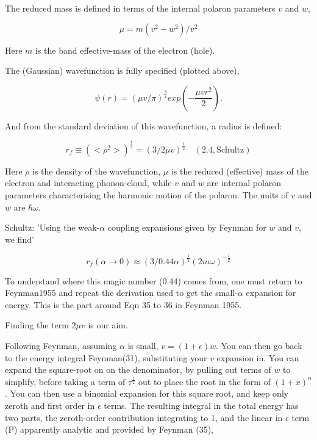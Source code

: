 \documentclass[twocolumn,11pt]{article}
\begin{document}
The reduced mass is defined in terms of the internal polaron parameters $v$ and
$w$,

\begin{equation}
	\mu=m(v^2-w^2)/v^2
\end{equation}

Here $m$ is the band effective-mass of the electron (hole). 

The (Gaussian) wavefunction is fully specified (plotted above),

\begin{equation}
	\psi(r)=(\mu v/\pi)^{\frac{3}{4}} exp(-\frac{\mu v r^2}{2}).
\end{equation}

And from the standard deviation of this wavefunction, a
radius is defined:

\begin{equation}
    r_f \equiv (<\rho^2>)^{\frac{1}{2}} = (3/2\mu v)^{\frac{1}{2}}
    \quad \mathrm{(2.4, Schultz)}
\end{equation}    

Here $\rho$ is the density of the wavefunction, $\mu$ is the reduced
(effective) mass of the electron and interacting phonon-cloud, while
$v$ and \(w\) are internal polaron parameters characterising the
harmonic motion of the polaron. The units of $v$ and \(w\) are
$\hbar\omega$.

Schultz: 'Using the weak-$\alpha$ coupling expansions given by Feynman for $w$
and $v$, we find'

\begin{equation}
    r_f (\alpha\rightarrow 0) \approx (3/0.44\alpha)^{\frac{1}{2}} (2m\omega)^{-\frac{1}{2}}
\end{equation}

To understand where this magic number (0.44) comes from, one must return
to Feynman1955 and repeat the derivation used to get the
small-$\alpha$ expansion for energy. 
This is the part around Eqn 35 to 36 in Feynman 1955.

Finding the term $2\mu v$ is our aim.

Following Feynman, assuming $\alpha$ is small, $v=(1+\epsilon)w$.
You can then go back to the energy integral Feynman(31), substituting
your $v$ expansion in. You can expand the square-root on on the
denominator, by pulling out terms of $w$ to simplify, before taking a
term of $\tau^{\frac{1}{2}}$ out to place the root in the form of
$(1+x)^n$. You can then use a binomial expansion for this square root,
and keep only zeroth and first order in $\epsilon$ terms. The
resulting integral in the total energy has two parts, the zeroth-order
contribution integrating to 1, and the linear in $\epsilon$ term (P)
apparently analytic and provided by Feynman (35),
\end{document}
